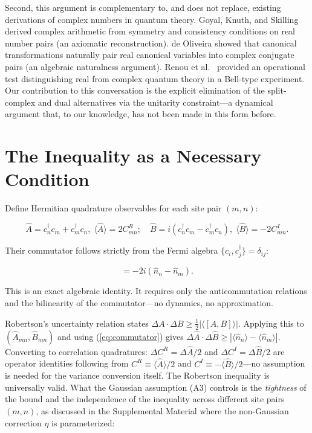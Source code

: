 \documentclass[aps,prd,reprint,superscriptaddress,twocolumn]{revtex4-2}
\begin{document}
Second, this argument is complementary to, and does not replace, existing derivations of complex numbers in quantum theory. Goyal, Knuth, and Skilling \cite{Goyal2009} derived complex arithmetic from symmetry and consistency conditions on real number pairs (an axiomatic reconstruction). de Oliveira \cite{deOliveira2023} showed that canonical transformations naturally pair real canonical variables into complex conjugate pairs (an algebraic naturalness argument). Renou et al.\ \cite{Renou2021} provided an operational test distinguishing real from complex quantum theory in a Bell-type experiment. Our contribution to this conversation is the explicit elimination of the split-complex and dual alternatives via the unitarity constraint---a dynamical argument that, to our knowledge, has not been made in this form before.

\section{The Inequality as a Necessary Condition}

Define Hermitian quadrature observables for each site pair $(m,n)$:

\begin{equation}
\hat{A} = c^\dagger_n c_m + c^\dagger_m c_n,\; \langle\hat{A}\rangle = 2C^R_{mn};\quad
\hat{B} = i(c^\dagger_n c_m - c^\dagger_m c_n),\; \langle\hat{B}\rangle = -2C^I_{mn}.
\end{equation}

Their commutator follows strictly from the Fermi algebra $\{c_i, c^\dagger_j\} = \delta_{ij}$:

\begin{equation}
[\hat{A}, \hat{B}] = -2i(\hat{n}_n - \hat{n}_m).
\label{eq:commutator}
\end{equation}

This is an exact algebraic identity. It requires only the anticommutation relations and the bilinearity of the commutator---no dynamics, no approximation.

Robertson's uncertainty relation \cite{Robertson1929} states $\Delta A \cdot \Delta B \geq \frac{1}{2}|\langle[A,B]\rangle|$. Applying this to $(\hat{A}_{mn}, \hat{B}_{mn})$ and using (\ref{eq:commutator}) gives $\Delta\hat{A} \cdot \Delta\hat{B} \geq |\langle\hat{n}_n\rangle - \langle\hat{n}_m\rangle|$. Converting to correlation quadratures: $\Delta C^R = \Delta\hat{A}/2$ and $\Delta C^I = \Delta\hat{B}/2$ are operator identities following from $C^R \equiv \langle\hat{A}\rangle/2$ and $C^I \equiv -\langle\hat{B}\rangle/2$---no assumption is needed for the variance conversion itself. The Robertson inequality is universally valid. What the Gaussian assumption (A3) controls is the \textit{tightness} of the bound and the independence of the inequality across different site pairs $(m,n)$, as discussed in the Supplemental Material \cite{SM} where the non-Gaussian correction $\eta$ is parameterized:
\end{document}

